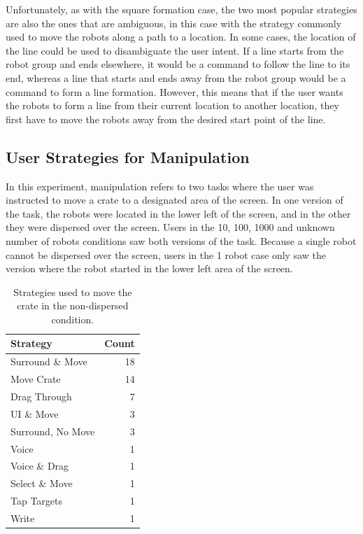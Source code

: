 Unfortunately, as with the square formation case, the two most popular strategies are also the ones that are ambiguous, in this case with the strategy commonly used to move the robots along a path to a location. 
In some cases, the location of the line could be used to disambiguate the user intent. 
If a line starts from the robot group and ends elsewhere, it would be a command to follow the line to its end, whereas a line that starts and ends away from the robot group would be a command to form a line formation. 
However, this means that if the user wants the robots to form a line from their current location to another location, they first have to move the robots away from the desired start point of the line. 

\subsection{User Strategies for Manipulation}\label{sec:user_manipulation}

In this experiment, manipulation refers to two tasks where the user was instructed to move a crate to a designated area of the screen. 
In one version of the task, the robots were located in the lower left of the screen, and in the other they were dispersed over the screen. 
Users in the 10, 100, 1000 and unknown number of robots conditions saw both versions of the task. 
Because a single robot cannot be dispersed over the screen, users in the 1 robot case only saw the version where the robot started in the lower left area of the screen. 

\begin{table}
	\centering
	\begin{tabular}{l r}
		Strategy & Count\\
		\hline
		Surround \& Move & 18\\
		Move Crate & 14\\
		Drag Through & 7\\
		UI \& Move & 3\\
		Surround, No Move & 3\\
		Voice & 1\\
		Voice \& Drag & 1\\
		Select \& Move & 1 \\
		Tap Targets & 1\\
		Write & 1\\
	\end{tabular}
	\caption{Strategies used to move the crate in the non-dispersed condition.}
	\label{tab:crate_strategies}
\end{table}

